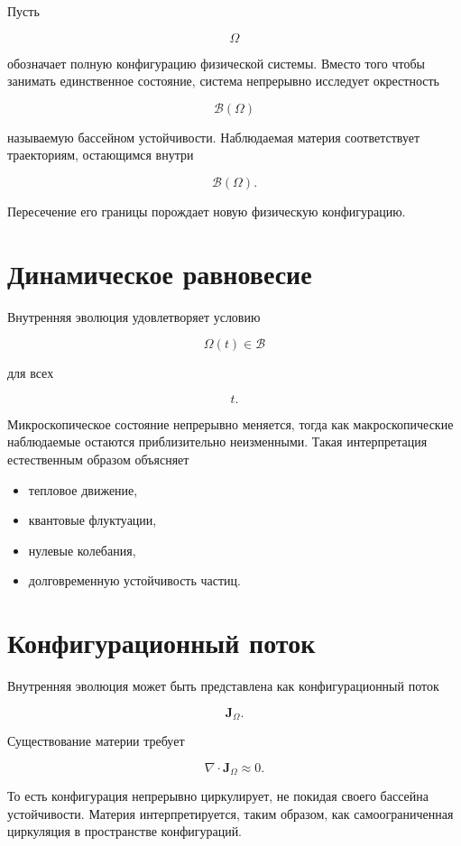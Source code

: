 Пусть

\[ \Omega \]

обозначает полную конфигурацию физической системы. Вместо того чтобы занимать единственное состояние, система непрерывно исследует окрестность

\[ \mathcal B(\Omega) \]

называемую бассейном устойчивости. Наблюдаемая материя соответствует траекториям, остающимся внутри

\[ \mathcal B(\Omega). \]

Пересечение его границы порождает новую физическую конфигурацию.

\section{Динамическое равновесие}

Внутренняя эволюция удовлетворяет условию

\[ \boxed{ \Omega(t)\in\mathcal B } \]

для всех

\[ t. \]

Микроскопическое состояние непрерывно меняется, тогда как макроскопические наблюдаемые остаются приблизительно неизменными. Такая интерпретация естественным образом объясняет

\begin{itemize}

\item тепловое движение,

\item квантовые флуктуации,

\item нулевые колебания,

\item долговременную устойчивость частиц.

\end{itemize}

\section{Конфигурационный поток}

Внутренняя эволюция может быть представлена как конфигурационный поток

\[ \mathbf J_\Omega . \]

Существование материи требует

\[ \nabla\cdot\mathbf J_\Omega \approx0. \]

То есть конфигурация непрерывно циркулирует, не покидая своего бассейна устойчивости. Материя интерпретируется, таким образом, как самоограниченная циркуляция в пространстве конфигураций.

